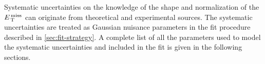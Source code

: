 Systematic uncertainties on the knowledge of the shape and normalization of the
$E_\mathrm{\, T}^\mathrm{\, miss}$ can originate from theoretical and experimental sources. The systematic
uncertainties are treated as Gaussian nuisance parameters in the fit procedure
described in \cref{sec:fit-strategy}. A complete list of all the parameters used
to model the systematic uncertainties and included in the fit is given in the
following sections.
